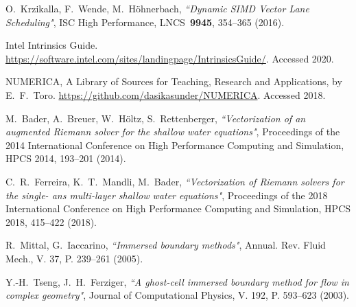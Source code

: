 \documentclass[
11pt,%
tightenlines,%
twoside,%
onecolumn,%
nofloats,%
nobibnotes,%
nofootinbib,%
superscriptaddress,%
noshowpacs,%
centertags]%
{revtex4}
\begin{document}
\begin{thebibliography}{99}
O.~Krzikalla, F.~Wende, M.~H\"ohnerbach, {\it ``Dynamic SIMD Vector Lane Scheduling"}, ISC High Performance, LNCS~{\bf 9945}, 354--365 (2016).

Intel Intrinsics Guide. \url{https://software.intel.com/sites/landingpage/IntrinsicsGuide/}. Accessed 2020.

NUMERICA, A Library of Sources for Teaching, Research and Applications, by E.~F.~Toro. \url{https://github.com/dasikasunder/NUMERICA}. Accessed 2018.

M.~Bader, A.~Breuer, W.~H{\"o}ltz, S.~Rettenberger, {\it ``Vectorization of an augmented Riemann solver for the shallow water equations"}, Proceedings of the 2014 International Conference on High Performance Computing and Simulation, HPCS 2014, 193--201 (2014).

C.~R.~Ferreira, K.~T.~Mandli, M.~Bader, {\it ``Vectorization of Riemann solvers for the single- ans multi-layer shallow water equations"}, Proceedings of the 2018 International Conference on High Performance Computing and Simulation, HPCS 2018, 415--422 (2018).

R.~Mittal, G.~Iaccarino, {\it ``Immersed boundary methods"}, Annual. Rev. Fluid Mech., V. 37, P. 239--261 (2005).

Y.-H.~Tseng, J.~H.~Ferziger, {\it ``A ghost-cell immersed boundary method for flow in complex geometry"}, Journal of Computational Physics, V. 192, P. 593--623 (2003).

\end{thebibliography}
\end{document}
